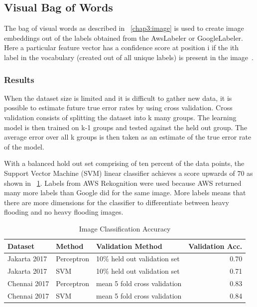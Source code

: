\subsection{Visual Bag of Words}
The bag of visual words as described in \sectionautorefname{}~\ref{chap3:image}
is used to create image embeddings out of the labels obtained from the
AwsLabeler or GoogleLabeler. Here a particular feature vector has a confidence
score at position i if the ith label in the vocabulary (created out of all
unique labels) is present in the
image~\cite{yangEvaluatingBagofvisualwordsRepresentations2007}.

\subsubsection{Results}
When the dataset size is limited and it is difficult to gather new data, 
it is possible to estimate future true error rates by using
cross validation. Cross validation consists of splitting the dataset into
k many groups. The learning model is then trained on k-1 groups and tested 
against the held out group. The average error over all k groups is then 
taken as an estimate of the true error rate of the model.

With a balanced hold out set comprising of ten percent of the
data points, the Support Vector Machine (SVM) linear classifier achieves a score
upwards of \.70 as shown in \tablename{}~\ref{chap4:imageSvmPerceptron}.
Labels from AWS Rekognition were used because AWS returned many more labels than 
Google did for the same image. More labels means that there are more dimensions
for the classifier to differentiate between heavy flooding and no heavy flooding
images.

\begin{table}[htbp]
\centering
\caption{Image Classification Accuracy}
\label{chap4:imageSvmPerceptron}
\begin{tabular}{lllr}
\toprule
      Dataset &      Method &           Validation Method &  Validation Acc. \\
\hline
 Jakarta 2017 &  Perceptron &     10\% held out validation set &             0.70 \\
\midrule
 Jakarta 2017 &         SVM &     10\% held out validation set &             0.71 \\
 Chennai 2017 &  Perceptron &  mean 5 fold cross validation &             0.83 \\
 Chennai 2017 &         SVM &  mean 5 fold cross validation &             0.84 \\
\bottomrule
\end{tabular}
\end{table}


